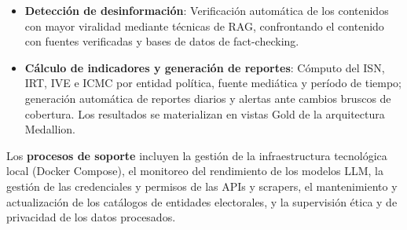 \begin{itemize}
    \item \textbf{Detección de desinformación}: Verificación automática de los contenidos con mayor viralidad mediante técnicas de RAG, confrontando el contenido con fuentes verificadas y bases de datos de fact-checking.

    \item \textbf{Cálculo de indicadores y generación de reportes}: Cómputo del ISN, IRT, IVE e ICMC por entidad política, fuente mediática y período de tiempo; generación automática de reportes diarios y alertas ante cambios bruscos de cobertura. Los resultados se materializan en vistas Gold de la arquitectura Medallion.
\end{itemize}

Los \textbf{procesos de soporte} incluyen la gestión de la infraestructura tecnológica local (Docker Compose), el monitoreo del rendimiento de los modelos LLM, la gestión de las credenciales y permisos de las APIs y scrapers, el mantenimiento y actualización de los catálogos de entidades electorales, y la supervisión ética y de privacidad de los datos procesados.